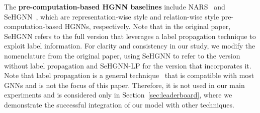 \documentclass[lettersize,journal]{IEEEtran}
\begin{document}
The \textbf{pre-computation-based HGNN baselines} include NARS~\cite{yu2020scalable} and SeHGNN~\cite{yang2022simple}, which are representation-wise style and relation-wise style pre-computation-based HGNNs, respectively.
Note that in the original paper, SeHGNN refers to the full version that leverages a label propagation technique to exploit label information.
For clarity and consistency in our study, we modify the nomenclature from the original paper, using SeHGNN to refer to the version without label propagation and SeHGNN-LP for the version that incorporates it.
Note that label propagation is a general technique~\cite{zhu2005semi,DBLP:conf/nips/ZhouBLWS03,DBLP:conf/iclr/HuangHSLB21} that is compatible with most GNNs and is not the focus of this paper.
Therefore, it is not used in our main experiments and is considered only in Section~\ref{sec:leaderboard}, where we demonstrate the successful integration of our model with other techniques.








\begin{table}[!tp]
\vspace{-2mm}
\centering
\caption{Statistics of Datasets.}
\label{tab:datasets_statistics}
\end{table}
\end{document}
